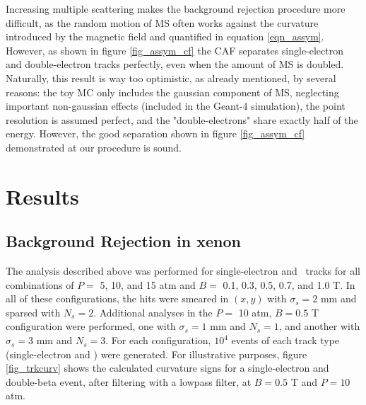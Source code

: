 \documentclass{JINST}
\begin{document}
Increasing multiple scattering  makes the background rejection procedure more difficult, as the random motion
of MS often works against the curvature introduced by the magnetic field and quantified in
equation \ref{eqn_assym}. However, as shown in figure \ref{fig_assym_cf} the CAF separates single-electron and double-electron tracks perfectly, even when the amount of MS is doubled. Naturally, this result is way too optimistic, as already mentioned, by several reasons: the toy MC only includes the gaussian component of MS, neglecting important non-gaussian effects (included in the Geant-4 simulation), the point resolution is assumed perfect, and the "double-electrons" share exactly half of the energy. However, the good separation shown in figure \ref{fig_assym_cf} demonstrated at our procedure is sound. 

\section{Results}\label{sec:results}
\subsection{Background Rejection in xenon}
The analysis described above was performed for single-electron and
\bbonu\ tracks for all combinations of $P =$ 5, 10, and 15 atm and $B =$ 0.1, 0.3, 0.5, 0.7, 
and 1.0 T.  In all of these configurations, the hits were smeared in $(x,y)$ with $\sigma_{s} = 2$ mm and 
sparsed with $N_{s} = 2$.  Additional analyses in the $P =$ 10 atm, $B = 0.5$ T configuration were performed, 
one with $\sigma_{s} = 1$ mm and $N_{s} = 1$, and another with $\sigma_{s} = 3$ mm and $N_{s} = 3$.  For 
each configuration, $10^4$ events of each track type (single-electron and \bbonu) were generated. 
For illustrative purposes, figure \ref{fig_trkcurv} shows the calculated curvature signs for a single-electron and double-beta event, after filtering with a lowpass filter, at $B = 0.5$ T and $P = 10$ atm.  
\end{document}
